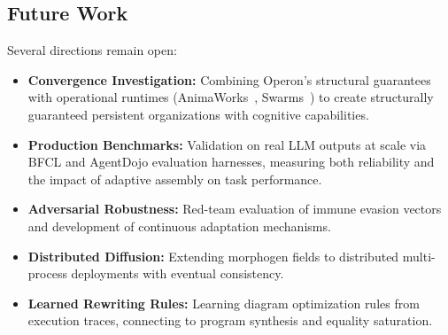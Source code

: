 \subsection*{Future Work}

Several directions remain open:
\begin{itemize}[leftmargin=*]
\item \textbf{Convergence Investigation:} Combining Operon's structural guarantees with operational runtimes (AnimaWorks~\cite{animaworks}, Swarms~\cite{swarms}) to create structurally guaranteed persistent organizations with cognitive capabilities.
\item \textbf{Production Benchmarks:} Validation on real LLM outputs at scale via BFCL and AgentDojo evaluation harnesses, measuring both reliability and the impact of adaptive assembly on task performance.
\item \textbf{Adversarial Robustness:} Red-team evaluation of immune evasion vectors and development of continuous adaptation mechanisms.
\item \textbf{Distributed Diffusion:} Extending morphogen fields to distributed multi-process deployments with eventual consistency.
\item \textbf{Learned Rewriting Rules:} Learning diagram optimization rules from execution traces, connecting to program synthesis and equality saturation.
\end{itemize}
